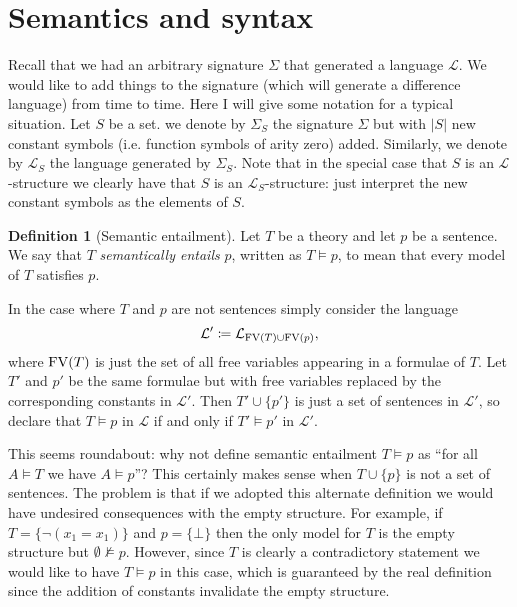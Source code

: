 \documentclass{report}
\theoremstyle{definition}
\theoremstyle{plain}
\theoremstyle{definition}
\newtheorem{defn}[thm]{Definition}
\begin{document}
	\section{Semantics and syntax}
	Recall that we had an arbitrary signature $\Sigma$ that generated a language $\mathcal{L}$. We would like to add things to the signature (which will generate a difference language) from time to time. Here I will give some notation for a typical situation. Let $S$ be a set. we denote by $\Sigma_S$ the signature $\Sigma$ but with $|S|$ new constant symbols (i.e. function symbols of arity zero) added. Similarly, we denote by $\mathcal{L}_S$ the language generated by $\Sigma_S$. Note that in the special case that $S$ is an $\mathcal{L}$-structure we clearly have that $S$ is an $\mathcal{L}_S$-structure: just interpret the new constant symbols as the elements of $S$. 
	\begin{defn}[Semantic entailment]
		 Let $T$ be a theory and let $p$ be a sentence. We say that $T$ \emph{semantically entails} $p$, written as $T\models p$, to mean that every model of $T$ satisfies $p$.
		 
		 In the case where $T$ and $p$ are not sentences simply consider the language 
		 \[\mathcal{L}'\coloneqq \mathcal{L}_{\textnormal{FV}(T)\cup\textnormal{FV}(p)},\]
		 where $\textnormal{FV}(T)$ is just the set of all free variables appearing in a formulae of $T$. Let $T'$ and $p'$ be the same formulae but with free variables replaced by the corresponding constants in $\mathcal{L}'$. Then $T'\cup\{p'\}$ is just a set of sentences in $\mathcal{L}'$, so declare that $T\models p$ in $\mathcal{L}$ if and only if $T'\models p'$ in $\mathcal{L}'$.
	\end{defn}
	This seems roundabout: why not define semantic entailment $T\models p$ as ``for all $A\models T$ we have $A\models p$''? This certainly makes sense when $T\cup\{p\}$ is not a set of sentences. The problem is that if we adopted this alternate definition we would have undesired consequences with the empty structure. For example, if $T=\{\neg(x_1 = x_1)\}$ and $p = \{\bot\}$ then the only model for $T$ is the empty structure but $\emptyset \nvDash p$. However, since $T$ is clearly a contradictory statement we would like to have $T\models p$ in this case, which is guaranteed by the real definition since the addition of constants invalidate the empty structure.
	
\end{document}
